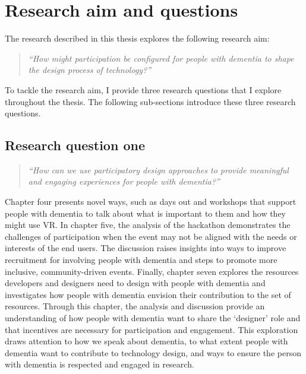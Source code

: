 \section{Research aim and questions}
\label{Intro:RQ}
The research described in this thesis explores the following research aim:
\begin{quote}
    \textit{``How might participation be configured for people with dementia to shape the design process of technology?''}
\end{quote}
To tackle the research aim, I provide three research questions that I explore throughout the thesis. The following sub-sections introduce these three research questions.

\subsection{Research question one}
\label{RQ1}
\begin{quote}
\textit{``How can we use participatory design approaches to provide meaningful and engaging experiences for people with dementia?''}
\end{quote}
Chapter four presents novel ways, such as days out and workshops that support people with dementia to talk about what is important to them and how they might use VR. In chapter five, the analysis of the hackathon demonstrates the challenges of participation when the event may not be aligned with the needs or interests of the end users. The discussion raises insights into ways to improve recruitment for involving people with dementia and steps to promote more inclusive, community-driven events. Finally, chapter seven explores the resources developers and designers need to design with people with dementia and investigates how people with dementia envision their contribution to the set of resources. Through this chapter, the analysis and discussion provide an understanding of how people with dementia want to share the `designer' role and that incentives are necessary for participation and engagement. This exploration draws attention to how we speak about dementia, to what extent people with dementia want to contribute to technology design, and ways to ensure the person with dementia is respected and engaged in research.

